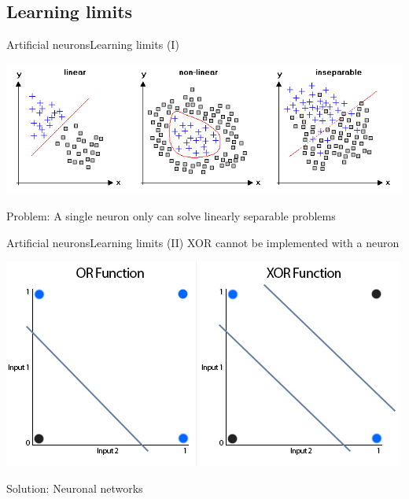 \documentclass[10pt,compress]{beamer} %
\begin{document}
\subsection{Learning limits}
\begin{frame}{Artificial neurons}{Learning limits (I)}
	\begin{center}
	\includegraphics[width=0.9\linewidth]{figs/linear2.png}
	\end{center}
	Problem: A single neuron only can solve linearly separable problems
\end{frame}

\begin{frame}{Artificial neurons}{Learning limits (II)}
	XOR cannot be implemented with a neuron
	\begin{center}
	\includegraphics[width=0.7\linewidth]{figs/xor.jpg}
	\end{center}
	Solution: Neuronal networks
\end{frame}

\end{document}

